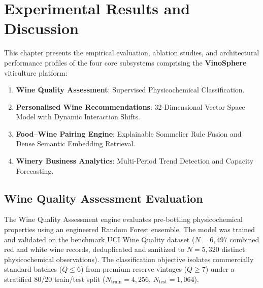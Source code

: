 
\section{Experimental Results and Discussion}
\label{sec:results_and_discussion}

This chapter presents the empirical evaluation, ablation studies, and architectural performance profiles of the four core subsystems comprising the \textbf{VinoSphere} viticulture platform:
\begin{enumerate}
    \item \textbf{Wine Quality Assessment}: Supervised Physicochemical Classification.
    \item \textbf{Personalised Wine Recommendations}: 32-Dimensional Vector Space Model with Dynamic Interaction Shifts.
    \item \textbf{Food--Wine Pairing Engine}: Explainable Sommelier Rule Fusion and Dense Semantic Embedding Retrieval.
    \item \textbf{Winery Business Analytics}: Multi-Period Trend Detection and Capacity Forecasting.
\end{enumerate}

\subsection{Wine Quality Assessment Evaluation}
\label{subsec:results_wine_quality}

The Wine Quality Assessment engine evaluates pre-bottling physicochemical properties using an engineered Random Forest ensemble. The model was trained and validated on the benchmark UCI Wine Quality dataset ($N = 6,497$ combined red and white wine records, deduplicated and sanitized to $N = 5,320$ distinct physicochemical observations). The classification objective isolates commercially standard batches ($Q \le 6$) from premium reserve vintages ($Q \ge 7$) under a stratified 80/20 train/test split ($N_{\text{train}} = 4,256$, $N_{\text{test}} = 1,064$).

